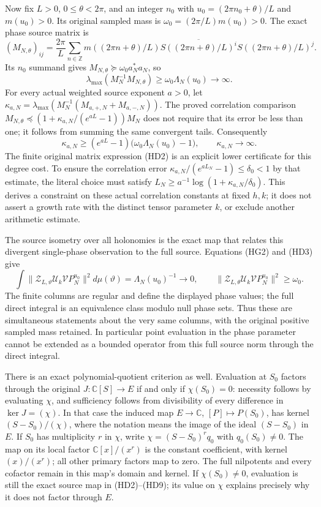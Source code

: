 Now fix $L>0$, $0\le\theta<2\pi$, and an integer $n_0$ with
$u_0=(2\pi n_0+\theta)/L$ and $m(u_0)>0$. Its original sampled mass is
$\omega_0=(2\pi/L)m(u_0)>0$. The exact phase source matrix is
\[
 (M_{N,\theta})_{ij}=\frac{2\pi}{L}
 \sum_{n\in\mathbb Z}m((2\pi n+\theta)/L)
 \overline{S((2\pi n+\theta)/L)^i}
 S((2\pi n+\theta)/L)^j .
 \tag{HD6}
\]
Its $n_0$ summand gives
$M_{N,\theta}\succeq\omega_0 a_N^*a_N$, so
\[
 \lambda_{\max}(M_N^{-1}M_{N,\theta})
 \ge\omega_0\Lambda_N(u_0)\longrightarrow\infty .
 \tag{HD7}
\]
For every actual weighted source exponent $a>0$, let
$\kappa_{a,N}=\lambda_{\max}
(M_N^{-1}(M_{a,+,N}+M_{a,-,N}))$.
The proved correlation comparison
$M_{N,\theta}\preceq
(1+\kappa_{a,N}/(e^{aL}-1))M_N$ does not require that its error be
less than one; it follows from summing the same convergent tails.
Consequently
\[
 \boxed{\kappa_{a,N}\ge
 (e^{aL}-1)\bigl(\omega_0\Lambda_N(u_0)-1\bigr),\qquad
 \kappa_{a,N}\longrightarrow\infty .}
 \tag{HD8}
\]
The finite original matrix expression (HD2) is an explicit lower
certificate for this degree cost. To ensure the correlation error
$\kappa_{a,N}/(e^{aL_N}-1)\le\delta_0<1$ by that estimate, the
literal choice must satisfy
$L_N\ge a^{-1}\log(1+\kappa_{a,N}/\delta_0)$.
This derives a constraint on these actual correlation constants at fixed
$h,k$; it does not assert a growth rate with the distinct tensor
parameter $k$, or exclude another arithmetic estimate.

The source isometry over all holonomies is the exact map that relates
this divergent single-phase observation to the full source. Equations
(HG2) and (HD3) give
\[
 \int\|\mathcal Z_{L,\vartheta}\mathcal U_k
               \mathcal V P_N^{u_0}\|^2d\mu(\vartheta)
 =\Lambda_N(u_0)^{-1}\longrightarrow0,
 \qquad
 \|\mathcal Z_{L,\theta}\mathcal U_k
               \mathcal V P_N^{u_0}\|^2\ge\omega_0 .
 \tag{HD9}
\]
The finite columns are regular and define the displayed phase values;
the full direct integral is an equivalence class modulo null phase
sets. Thus these are simultaneous statements about the very same
columns, with the original positive sampled mass retained. In particular
point evaluation in the phase parameter cannot be extended as a bounded
operator from this full source norm through the direct integral.

There is an exact polynomial-quotient criterion as well. Evaluation at
$S_0$ factors through the original $J:\mathbb C[S]\to E$ if and
only if $\chi(S_0)=0$: necessity follows by evaluating $\chi$,
and sufficiency follows from divisibility of every difference in
$\ker J=(\chi)$. In that case the induced map
$E\to\mathbb C$, $[P]\mapsto P(S_0)$, has kernel
$(S-S_0)/(\chi)$, where the notation means the image of the ideal
$(S-S_0)$ in $E$. If $S_0$ has multiplicity $r$ in $\chi$, write
$\chi=(S-S_0)^r q_0$ with $q_0(S_0)\ne0$. The map on its local
factor $\mathbb C[x]/(x^r)$ is the constant coefficient, with kernel
$(x)/(x^r)$; all other primary factors map to zero. The full
nilpotents and every cofactor remain in this map's domain and kernel.
If $\chi(S_0)\ne0$, evaluation is still the exact source map in
(HD2)--(HD9); its value on $\chi$ explains precisely why it does not
factor through $E$.

